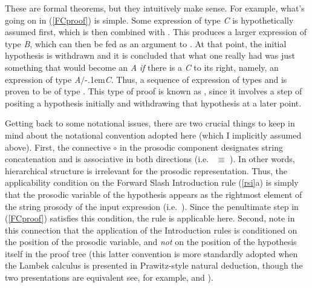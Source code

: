 \documentclass[output=paper,biblatex,babelshorthands,newtxmath,draftmode,colorlinks,citecolor=brown]{langscibook}
\begin{document}
\noindent
These are formal theorems, but they intuitively make sense.
For example, what's going on in  (\ref{FCproof}) is simple. 
Some expression of type  \textit{C} is 
hypothetically assumed first, which is then combined with
. This produces a larger expression
of type \textit{B}, which can then be fed as an argument to
. 
At that point, the initial hypothesis is withdrawn and it is concluded
that what one really had was just something that would become an \textit{A} \emph{if}
there is a \textit{C} to its right, namely, an expression of type \textit{A}\ensuremath{/}\kern-.1em\textit{C}.
Thus, a sequence of expression of types  and 
is proven to be of type .  This type of proof
is known as , since it involves a step of
positing a hypothesis initially and withdrawing that hypothesis
at a later point.

Getting back to some notational issues, there are two crucial things
to keep in mind about the notational 
convention adopted here (which I implicitly assumed above). First, the
connective \ensuremath{\circ}\xspace in the prosodic component designates string
concatenation and is associative in both directions
(i.e.\  \pt{ (\ensuremath{\greekp_1} \ensuremath{\circ}\xspace \ensuremath{\greekp_2}) \ensuremath{\circ}\xspace \ensuremath{\greekp_3}} \ensuremath{ \equiv\xspace } \pt{ \ensuremath{\greekp_1} \ensuremath{\circ}\xspace (\ensuremath{\greekp_2} \ensuremath{\circ}\xspace \ensuremath{\greekp_3}) }). In other words, hierarchical
structure is irrelevant for the prosodic representation. Thus,
the applicability condition on the Forward Slash
Introduction rule (\ref{rsi}a) is simply that
the prosodic variable \pt{ \ensuremath{\greekp} }
of the hypothesis appears as the rightmost element of the
string prosody of the input expression (i.e.\
\pt{\ptv{b} \ensuremath{\circ}\xspace \ensuremath{\greekp} }).
Since the penultimate step in (\ref{FCproof}) satisfies this 
condition, the rule is applicable here. Second, note in this
connection that the application of the
Introduction rules is conditioned on the position of the prosodic
variable, and \emph{not} on the position of the hypothesis itself in the
proof tree (this latter convention is more standardly adopted when the
Lambek calculus is presented in Prawitz-style natural deduction,
though the two presentations are
equivalent \emdashUS see, for example, \citealt[Chapter~5]{Carpenter98a-u} and
\citealt[Chapter~1]{jaeger05}).
\end{document}

